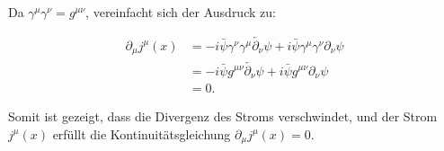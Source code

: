 Da $\gamma^\mu \gamma^\nu = g^{\mu\nu}$, vereinfacht sich der Ausdruck zu:

\begin{align*}
\partial_\mu j^\mu(x) &= -i \bar{\psi} \gamma^\nu \gamma^\mu \overleftarrow{\partial_\nu} \psi + i \bar{\psi} \gamma^\mu \gamma^\nu \partial_\nu \psi \\
&= -i \bar{\psi} g^{\mu\nu} \overleftarrow{\partial_\nu} \psi + i \bar{\psi} g^{\mu\nu} \partial_\nu \psi \\
&= 0.
\end{align*}

Somit ist gezeigt, dass die Divergenz des Stroms verschwindet, und der Strom $j^\mu(x)$ erfüllt die Kontinuitätsgleichung $\partial_\mu j^\mu(x) = 0$.


